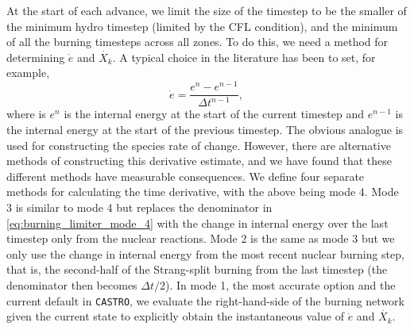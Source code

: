\documentclass[twocolumn,numberedappendix]{../aastex6}
\newcommand{\castro}{\texttt{CASTRO}}
\begin{document}
At the start of each advance, we limit the size of the timestep to be the smaller
of the minimum hydro timestep (limited by the CFL condition), and the minimum of all the
burning timesteps across all zones. To do this, we need a method for determining 
$\dot{e}$ and $\dot{X_k}$. A typical choice in the literature has been to set, for example,
\begin{equation}
  \dot{e} = \frac{e^{n} - e^{n-1}}{\Delta t^{n-1}}, \label{eq:burning_limiter_mode_4}
\end{equation}
where is $e^n$ is the internal energy at the start of the current timestep and
$e^{n-1}$ is the internal energy at the start of the previous timestep. 
The obvious analogue is used for constructing the species rate of change.
However, there are alternative methods of constructing this derivative estimate, 
and we have found that these different methods have measurable consequences.
We define four separate methods for calculating the time derivative, with 
the above being mode 4. Mode 3 is similar to mode 4 but replaces the
denominator in \autoref{eq:burning_limiter_mode_4} with the change in 
internal energy over the last timestep only from the nuclear reactions.
Mode 2 is the same as mode 3 but we only use the change in internal 
energy from the most recent nuclear burning step, that is, the second-half
of the Strang-split burning from the last timestep (the denominator 
then becomes $\Delta t / 2$). In mode 1, the most accurate option and 
the current default in \castro, we evaluate the right-hand-side of the 
burning network given the current state to explicitly obtain the 
instantaneous value of $\dot{e}$ and $\dot{X_k}$. 

\end{document}
